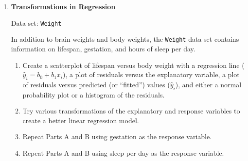 \documentclass[
]{book}
\begin{document}
\begin{enumerate}
  \begin{enumerate}
    \item Create individual value plots or side-by-side boxplots of the bradykininogen levels for each group. Compare the mean and standard deviation of each group. Do the data within each group look consistent with data from a normal population?
      \item Calculate the ANOVA model estimates in order to create a normal probability plot of the residuals. Do the error terms look consistent with data from a normal population?
      \item Transform the data by taking the log of the response. Create individual value plots or side-by-side boxplots of the transformed responses. Compare the mean and standard deviation of each group. Do the transformed data within each group look consistent with data from a normal population?
      \item Calculate the ANOVA model estimates using the transformed data in order to create a normal probability plot of the residuals. Do the error terms look consistent with data from a normal population? You may have to try out more than one transformation before you are satisfied with your answer to this part and Part C.
      \item Using the transformed data, calculate an ANOVA table, $F$-test, and $p$-value to determine if the three patient types differed in their mean bradykininogen levels.
    \end{enumerate}

  \item \textbf{Transformations in Regression}

Data set: \texttt{Weight}

In addition to brain weights and body weights, the \texttt{Weight} data set contains information on lifespan, gestation, and hours of sleep per day.

  \begin{enumerate}
    \item Create a scatterplot of lifespan versus body weight with a regression line ($\hat{y}_i = b_0 + b_1 x_i$), a plot of residuals versus the explanatory variable, a plot of residuals versus predicted (or “fitted”) values ($\hat{y}_i$), and either a normal probability plot or a histogram of the residuals.
      \item Try various transformations of the explanatory and response variables to create a better linear regression model.
      \item Repeat Parts A and B using gestation as the response variable.
      \item Repeat Parts A and B using sleep per day as the response variable.
    \end{enumerate}


\end{enumerate}
\end{document}
